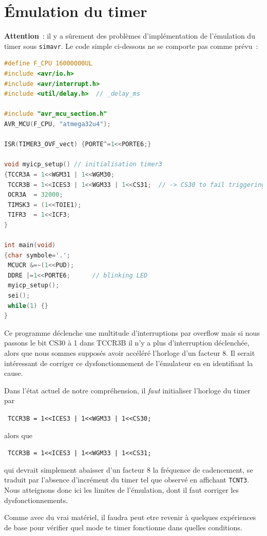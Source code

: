 \documentclass[a4paper]{article}
\begin{document}
\appendix\section{\'Emulation du timer}\label{tim}

{\bf Attention}~: il y a s\^urement des probl\`emes d'impl\'ementation de 
l'\'emulation du timer sous {\tt simavr}. Le code simple ci-dessous ne se 
comporte pas comme pr\'evu~:
\begin{lstlisting}[language=C]
#define F_CPU 16000000UL
#include <avr/io.h>
#include <avr/interrupt.h>
#include <util/delay.h>  // _delay_ms

#include "avr_mcu_section.h"     
AVR_MCU(F_CPU, "atmega32u4"); 

ISR(TIMER3_OVF_vect) {PORTE^=1<<PORTE6;}

void myicp_setup() // initialisation timer3
{TCCR3A = 1<<WGM31 | 1<<WGM30;
 TCCR3B = 1<<ICES3 | 1<<WGM33 | 1<<CS31;  // -> CS30 to fail triggering overflow
 OCR3A  = 32000;
 TIMSK3 = (1<<TOIE1);
 TIFR3  = 1<<ICF3;
}

int main(void)
{char symbole='.';
 MCUCR &=~(1<<PUD);
 DDRE |=1<<PORTE6;      // blinking LED
 myicp_setup();
 sei();
 while(1) {}
}
\end{lstlisting}

Ce programme d\'eclenche une multitude d'interruptions par overflow mais si 
nous passons le bit CS30 \`a 1 dans TCCR3B il n'y a plus d'interruption 
d\'eclench\'ee, alors que nous sommes suppos\'es avoir acc\'el\'er\'e 
l'horloge d'un facteur 8. Il serait int\'eressant de corriger ce 
dysfonctionnement de l'\'emulateur en en identifiant la cause.

Dans l'\'etat actuel de notre compr\'ehension, il {\em faut} initialiser 
l'horloge du timer par

\noindent
\verb! TCCR3B = 1<<ICES3 | 1<<WGM33 | 1<<CS30;!

\noindent
alors que 

\noindent
\verb! TCCR3B = 1<<ICES3 | 1<<WGM33 | 1<<CS31;!

\noindent
qui devrait simplement abaisser d'un facteur 8 la fr\'equence de cadencement, 
se traduit par l'absence d'incr\'ement du timer tel que observ\'e en affichant 
{\tt TCNT3}. Nous atteignons donc ici les limites de l'\'emulation, dont il 
faut corriger les dysfonctionnements.

Comme avec du vrai mat\'eriel, il faudra peut etre revenir \`a quelques 
exp\'eriences de base pour v\'erifier quel mode te timer fonctionne dans 
quelles conditions.
\end{document}
